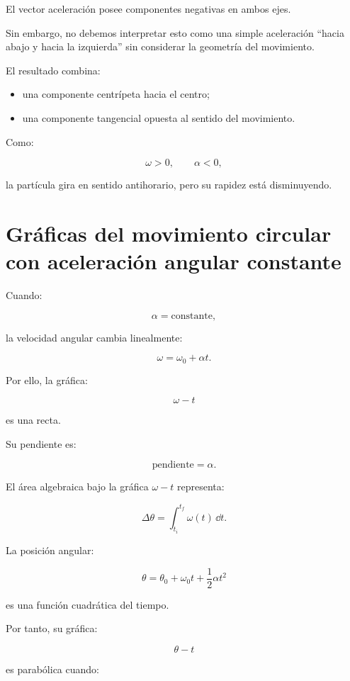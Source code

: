 \begin{interpretacion}

El vector aceleración posee componentes negativas en ambos ejes.

Sin embargo, no debemos interpretar esto como una simple aceleración
``hacia abajo y hacia la izquierda'' sin considerar la geometría del
movimiento.

El resultado combina:

\begin{itemize}
    \item una componente centrípeta hacia el centro;
    \item una componente tangencial opuesta al sentido del movimiento.
\end{itemize}

Como:

\[
\omega>0,
\qquad
\alpha<0,
\]

la partícula gira en sentido antihorario, pero su rapidez está disminuyendo.

\end{interpretacion}


\section{Gráficas del movimiento circular con aceleración angular constante}

Cuando:

\[
\alpha=\text{constante},
\]

la velocidad angular cambia linealmente:

\[
\omega=\omega_0+\alpha t.
\]

Por ello, la gráfica:

\[
\omega-t
\]

es una recta.

Su pendiente es:

\[
\boxed{
\text{pendiente}=\alpha
}.
\]

El área algebraica bajo la gráfica \(\omega-t\) representa:

\[
\boxed{
\Delta\theta
=
\int_{t_i}^{t_f}\omega(t)\,\dd t
}.
\]

La posición angular:

\[
\theta
=
\theta_0+\omega_0t+\frac12\alpha t^2
\]

es una función cuadrática del tiempo.

Por tanto, su gráfica:

\[
\theta-t
\]

es parabólica cuando:

